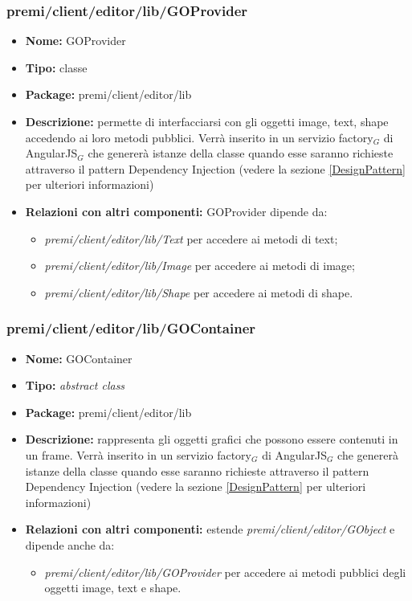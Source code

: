 \subsubsection{premi/client/editor/lib/GOProvider}
\begin{itemize}
  \item[] \textbf{Nome:} GOProvider
  \item[] \textbf{Tipo:} classe
  \item[] \textbf{Package:} premi/client/editor/lib
  \item[] \textbf{Descrizione:} permette di interfacciarsi con gli oggetti image, text, shape accedendo ai loro metodi pubblici. Verrà inserito in un servizio factory$_G$ di AngularJS$_G$ che genererà istanze della classe quando esse saranno richieste attraverso il pattern Dependency Injection (vedere la sezione \ref{DesignPattern} per ulteriori informazioni)
  \item[] \textbf{Relazioni con altri componenti:} GOProvider dipende da:
  \begin{itemize}
  	\item \textit{premi/client/editor/lib/Text} per accedere ai metodi di text;
  	\item \textit{premi/client/editor/lib/Image} per accedere ai metodi di image;
  	\item \textit{premi/client/editor/lib/Shape} per accedere ai metodi di shape.
  \end{itemize}
\end{itemize}
\subsubsection{premi/client/editor/lib/GOContainer}
\begin{itemize}
  \item[] \textbf{Nome:} GOContainer
  \item[] \textbf{Tipo:} \textit{abstract class}
  \item[] \textbf{Package:} premi/client/editor/lib
  \item[] \textbf{Descrizione:} rappresenta gli oggetti grafici che possono essere contenuti in un frame. Verrà inserito in un servizio factory$_G$ di AngularJS$_G$ che genererà istanze della classe quando esse saranno richieste attraverso il pattern Dependency Injection (vedere la sezione \ref{DesignPattern} per ulteriori informazioni)
  \item[] \textbf{Relazioni con altri componenti:} estende \textit{premi/client/editor/GObject} e dipende anche da:
  \begin{itemize} 
	\item \textit{premi/client/editor/lib/GOProvider} per accedere ai metodi pubblici degli oggetti image, text e shape.
\end{itemize}  
\end{itemize}
